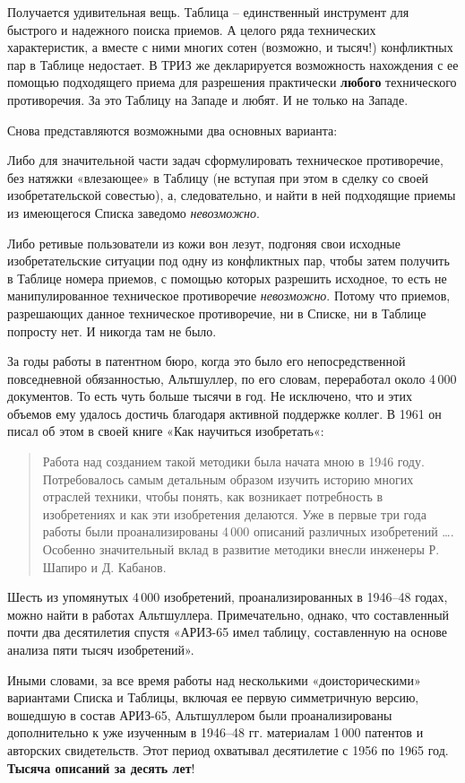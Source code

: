 \documentclass[11pt,a4paper]{article}
\begin{document}
Получается удивительная вещь. Таблица -- единственный инструмент для быстрого
и надежного поиска приемов. А целого ряда технических характеристик, а вместе
с ними многих сотен (возможно, и тысяч!) конфликтных пар в Таблице недостает.
В ТРИЗ же декларируется возможность нахождения с ее помощью подходящего приема
для разрешения практически \textbf{любого} технического противоречия. За это
Таблицу на Западе и любят. И не только на Западе.

Снова представляются возможными два основных варианта:

Либо для значительной части задач сформулировать техническое противоречие, без
натяжки «влезающее» в Таблицу (не вступая при этом в сделку со своей
изобретательской совестью), а, следовательно, и найти в ней подходящие приемы
из имеющегося Списка заведомо \emph{невозможно}.

Либо ретивые пользователи из кожи вон лезут, подгоняя свои исходные
изобретательские ситуации под одну из конфликтных пар, чтобы затем получить в
Таблице номера приемов, с помощью которых разрешить исходное, то есть не
манипулированное техническое противоречие \emph{невозможно}. Потому что
приемов, разрешающих данное техническое противоречие, ни в Списке, ни в
Таблице попросту нет. И никогда там не было.

За годы работы в патентном бюро, когда это было его непосредственной
повседневной обязанностью, Альтшуллер, по его словам, переработал около 4\,000
документов. То есть чуть больше тысячи в год. Не исключено, что и этих объемов
ему удалось достичь благодаря активной поддержке коллег. В 1961 он писал об
этом в своей книге «Как научиться изобретать«:
\begin{quote}
  Работа над созданием такой методики была начата мною в 1946 году.
  Потребовалось самым детальным образом изучить историю многих отраслей
  техники, чтобы понять, как возникает потребность в изобретениях и как эти
  изобретения делаются. Уже в первые три года работы были проанализированы
  4\,000 описаний различных изобретений …. Особенно значительный вклад в
  развитие методики внесли инженеры Р. Шапиро и Д. Кабанов.
\end{quote}
Шесть из упомянутых 4\,000 изобретений, проанализированных в 1946--48 годах,
можно найти в работах Альтшуллера. Примечательно, однако, что составленный
почти два десятилетия спустя «АРИЗ-65 имел таблицу, составленную на основе
анализа пяти тысяч изобретений». \cite[с. 140]{Altshuller1973} 

Иными словами, за все время работы над несколькими «доисторическими»
вариантами Списка и Таблицы, включая ее первую симметричную версию, вошедшую в
состав АРИЗ-65, Альтшуллером были проанализированы дополнительно к уже
изученным в 1946--48 гг. материалам 1\,000 патентов и авторских свидетельств.
Этот период охватывал десятилетие с 1956 по 1965 год. \textbf{Тысяча описаний
  за десять лет}!
\end{document}
